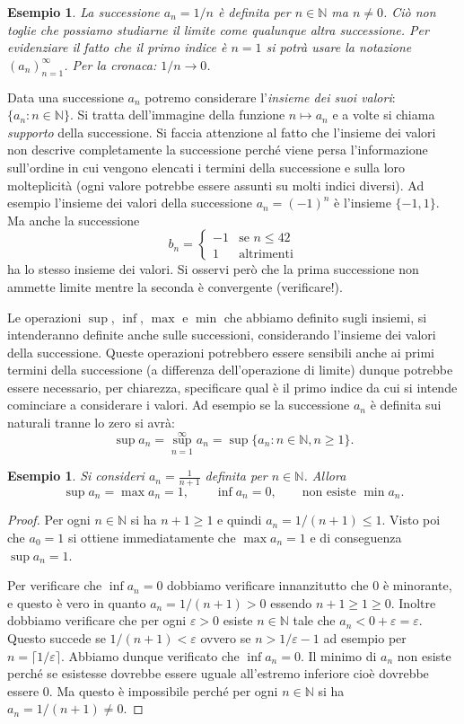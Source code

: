 \documentclass[italian,a4paper,oneside,headinclude]{scrbook}
\newcommand{\myemph}[1]{\emph{#1}\marginpar{#1}\index{#1}}
\newcommand{\eps}{\varepsilon}
\newcommand{\NN}{\mathbb N}
\newtheorem{example}[theorem]{Esempio}
\begin{document}
\begin{example}
La successione $a_n = 1/n$ è definita per $n\in \NN$ ma $n\neq 0$.
Ciò non toglie che possiamo studiarne il limite come qualunque altra
successione. Per evidenziare il fatto che il primo indice è $n=1$
si potrà usare la notazione $(a_n)_{n=1}^\infty$.
Per la cronaca: $1/n \to 0$.
\end{example}

Data una successione $a_n$ potremo considerare l'\emph{insieme
dei suoi valori}: $\{a_n\colon n\in \NN\}$.
Si tratta dell'immagine della funzione $n\mapsto a_n$
e a volte si chiama \myemph{supporto} della successione.
Si faccia attenzione al fatto che l'insieme dei valori
non descrive completamente la successione perché
viene persa l'informazione sull'ordine in cui vengono elencati
i termini della successione e sulla loro molteplicità (ogni valore
potrebbe essere assunti su molti indici diversi). Ad esempio
l'insieme dei valori della successione $a_n = (-1)^n$ è l'insieme $\{-1, 1\}$. Ma anche la successione
\[
 b_n = \begin{cases}
   -1 & \text{se $n\le 42$}\\
   1  & \text{altrimenti}
 \end{cases}
\]
ha lo stesso insieme dei valori. Si osservi però
che la prima successione non ammette limite mentre la seconda
è convergente (verificare!).

Le operazioni $\sup$, $\inf$, $\max$ e $\min$ che abbiamo
definito sugli insiemi, si intenderanno definite anche
sulle successioni, considerando l'insieme dei valori della successione.
Queste operazioni potrebbero essere sensibili anche ai primi termini della
successione (a differenza dell'operazione di limite) dunque potrebbe
essere necessario, per chiarezza, specificare qual è il primo indice
da cui si intende cominciare a considerare i valori. Ad esempio
se la successione $a_n$ è definita sui naturali tranne lo zero
si avrà:
\[
  \sup a_n = \sup_{n=1}^\infty a_n = \sup\{a_n \colon n \in \NN, n \ge 1\}.
\]

\begin{example}
Si consideri $a_n = \frac{1}{n+1}$ definita per $n\in \NN$.
Allora
\[
  \sup a_n = \max a_n = 1, \qquad
  \inf a_n = 0, \qquad \text{non esiste }\min a_n.
\]
\end{example}
\begin{proof}
Per ogni $n \in \NN$ si ha $n+1\ge 1$ e quindi $a_n = 1/(n+1) \le 1$.
Visto poi che $a_0 = 1$ si ottiene immediatamente che $\max a_n = 1$
e di conseguenza $\sup a_n = 1$.

Per verificare che $\inf a_n = 0$ dobbiamo verificare innanzitutto
che $0$ è minorante, e questo è vero in quanto $a_n = 1/(n+1)> 0$ essendo $n+1\ge 1 \ge 0$.
Inoltre dobbiamo verificare che per ogni $\eps >0$ esiste $n\in \NN$ tale
che $a_n < 0 + \eps = \eps$. Questo succede se $1/(n+1) < \eps$ ovvero
se $n > 1/\eps -1$ ad esempio per $n=\lceil 1/\eps\rceil$.
Abbiamo dunque verificato che $\inf a_n = 0$.
Il minimo di $a_n$ non esiste perché se esistesse dovrebbe essere uguale
all'estremo inferiore cioè dovrebbe essere $0$. Ma questo è impossibile
perché per ogni $n\in \NN$ si ha $a_n = 1/(n+1)\neq 0$.
\end{proof}
\end{document}
